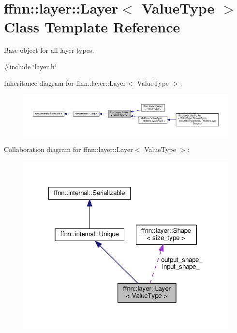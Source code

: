 \hypertarget{classffnn_1_1layer_1_1_layer}{\section{ffnn\-:\-:layer\-:\-:Layer$<$ Value\-Type $>$ Class Template Reference}
\label{classffnn_1_1layer_1_1_layer}
}


Base object for all layer types.  




{\ttfamily \#include \char`\"{}layer.\-h\char`\"{}}



Inheritance diagram for ffnn\-:\-:layer\-:\-:Layer$<$ Value\-Type $>$\-:
\nopagebreak
\begin{figure}[H]
\begin{center}
\leavevmode
\includegraphics[width=350pt]{classffnn_1_1layer_1_1_layer__inherit__graph}
\end{center}
\end{figure}


Collaboration diagram for ffnn\-:\-:layer\-:\-:Layer$<$ Value\-Type $>$\-:\nopagebreak
\begin{figure}[H]
\begin{center}
\leavevmode
\includegraphics[width=318pt]{classffnn_1_1layer_1_1_layer__coll__graph}
\end{center}
\end{figure}
